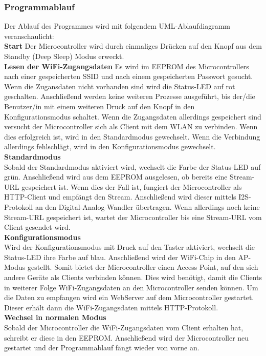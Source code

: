 \documentclass[]{article}
\begin{document}
\subsubsection{Programmablauf}
Der Ablauf des Programmes wird mit folgendem UML-Ablaufdiagramm veranschaulicht: \\
\textbf{Start} \newline
Der Microcontroller wird durch einmaliges Drücken auf den Knopf aus dem Standby (Deep Sleep) Modus erweckt. \newline \\
\textbf{Lesen der WiFi-Zugangsdaten} \newline
Es wird im EEPROM des Microcontrollers nach einer gespeicherten SSID und nach einem gespeicherten Passwort gesucht. Wenn die Zugansdaten nicht vorhanden sind wird die Status-LED auf rot geschalten. Anschließend werden keine weiteren Prozesse ausgeführt, bis der/die Benutzer/in mit einem weiteren Druck auf den Knopf in den Konfigurationsmodus schaltet. Wenn die Zugangsdaten allerdings gespeichert sind versucht der Microcontroller sich als Client mit dem WLAN zu verbinden. Wenn dies erfolgreich ist, wird in den Standardmodus gewechselt. Wenn die Verbindung allerdings fehlschlägt, wird in den Konfigurationsmodus gewechselt. \newline \\
\textbf{Standardmodus} \\
Sobald der Standardmodus aktiviert wird, wechselt die Farbe der Status-LED auf grün. Anschließend wird aus dem EEPROM ausgelesen, ob bereits eine Stream-URL gespeichert ist. Wenn dies der Fall ist, fungiert der Microcontroller als HTTP-Client und empfängt den Stream. Anschließend wird dieser mittels I2S-Protokoll an den Digital-Analog-Wandler übertragen. Wenn allerdings noch keine Stream-URL gespeichert ist, wartet der Microcontroller bis eine Stream-URL vom Client gesendet wird. \newline \\
\textbf{Konfigurationsmodus} \\
Wird der Konfigurationsmodus mit Druck auf den Taster aktiviert, wechselt die Status-LED ihre Farbe auf blau. Anschließend wird der WiFi-Chip in den AP-Modus gestellt. Somit bietet der Microcontroller einen Access Point, auf den sich andere Geräte als Clients verbinden können. Dies wird benötigt, damit die Clients in weiterer Folge WiFi-Zugangsdaten an den Microcontroller senden können. Um die Daten zu empfangen wird ein WebServer auf dem Microcontroller gestartet. Dieser erhält dann die WiFi-Zugangsdaten mittels HTTP-Protokoll. \newline \\
\textbf{Wechsel in normalen Modus} \\
Sobald der Microcontroller die WiFi-Zugangsdaten vom Client erhalten hat, schreibt er diese in den EEPROM. Anschließend wird der Microcontroller neu gestartet und der Programmablauf fängt wieder von vorne an.
\end{document}
